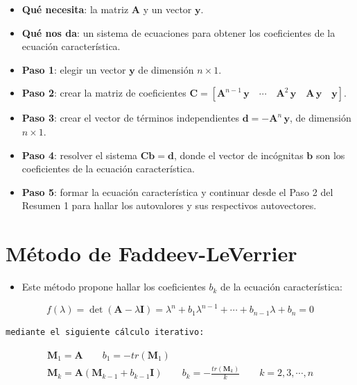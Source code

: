 \documentclass[openany]{book}
\providecommand{\tightlist}{%
  \setlength{\itemsep}{0pt}\setlength{\parskip}{0pt}}
\begin{document}
\begin{itemize}
\tightlist
\item
  \textbf{Qué necesita}: la matriz \(\mathbf{A}\) y un vector \(\mathbf{y}\).
\item
  \textbf{Qué nos da}: un sistema de ecuaciones para obtener los coeficientes de la ecuación característica.
\item
  \textbf{Paso 1}: elegir un vector \(\mathbf{y}\) de dimensión \(n \times 1\).
\item
  \textbf{Paso 2}: crear la matriz de coeficientes \(\mathbf{C} = [\mathbf{A}^{n-1} \, \mathbf{y} \quad \cdots \quad \mathbf{A}^2 \, \mathbf{y} \quad \mathbf{A} \, \mathbf{y} \quad \mathbf{y}]\).
\item
  \textbf{Paso 3}: crear el vector de términos independientes \(\mathbf{d} = - \mathbf{A}^n \, \mathbf{y}\), de dimensión \(n \times 1\).
\item
  \textbf{Paso 4}: resolver el sistema \(\mathbf{Cb=d}\), donde el vector de incógnitas \(\mathbf{b}\) son los coeficientes de la ecuación característica.
\item
  \textbf{Paso 5}: formar la ecuación característica y continuar desde el Paso 2 del Resumen 1 para hallar los autovalores y sus respectivos autovectores.
\end{itemize}

\hypertarget{muxe9todo-de-faddeev-leverrier}{%
\section{Método de Faddeev-LeVerrier}\label{muxe9todo-de-faddeev-leverrier}}

\begin{itemize}
\tightlist
\item
  Este método propone hallar los coeficientes \(b_k\) de la ecuación característica:
\end{itemize}

\[
f(\lambda) = \det(\textbf{A} - \lambda \textbf{I}) = \lambda^n + b_1 \lambda^{n-1} + \cdots + b_{n-1} \lambda + b_n = 0
\]

\begin{verbatim}
mediante el siguiente cálculo iterativo:
\end{verbatim}

\begin{gather*}
\textbf{M}_1 = \textbf{A} \qquad b_1 = - tr(\textbf{M}_1) \\
\textbf{M}_k = \textbf{A} (\textbf{M}_{k-1} + b_{k-1} \textbf{I}) \qquad b_k = - \frac{tr(\textbf{M}_k)}{k} \qquad k = 2, 3, \cdots, n\\
\end{gather*}
\end{document}
